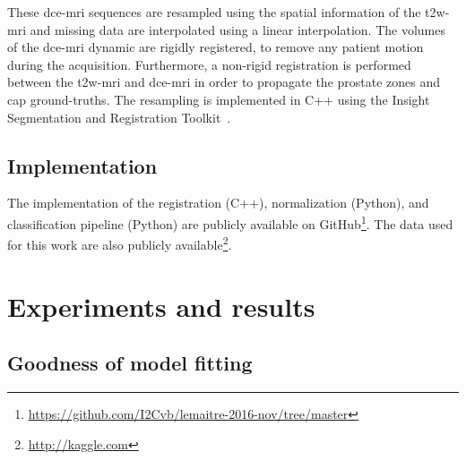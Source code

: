 These \ac{dce}-\ac{mri} sequences are resampled using the spatial information of the \ac{t2w}-\ac{mri} and missing data are interpolated using a linear interpolation.
The volumes of the \ac{dce}-\ac{mri} dynamic are rigidly registered, to remove any patient motion during the acquisition.
Furthermore, a non-rigid registration is performed between the \ac{t2w}-\ac{mri} and \ac{dce}-\ac{mri} in order to propagate the prostate zones and \ac{cap} ground-truths.
The resampling is implemented in C++ using the Insight Segmentation and Registration Toolkit~\citep{ibanez2005itk}.

\subsection{Implementation}

The implementation of the registration (C++), normalization (Python), and classification pipeline (Python) are publicly available on GitHub\footnote{\url{https://github.com/I2Cvb/lemaitre-2016-nov/tree/master}}.
The data used for this work are also publicly available\footnote{\url{http://kaggle.com}}.

\section{Experiments and results}\label{sec:experiments}

\subsection{Goodness of model fitting}\label{sec:fit}


\begin{table}
  \caption{Coefficient of determination $R^{2}$ (i.e., $\mu \ (\pm \sigma)$), while fitting data with the different quantification models.}
  \centering
  \label{tab:r2}
\end{table}

